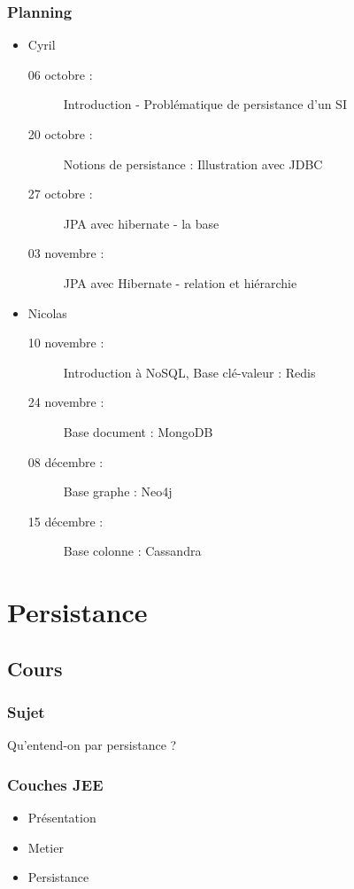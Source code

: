 \documentclass[t,12pt]{beamer}
\begin{document}
\begin{frame}
	\frametitle{Planning}

	\begin{itemize}
		\item Cyril
			\begin{description}
				\item [06 octobre : ] Introduction - Probl\'ematique de persistance d'un SI
				\item [20 octobre : ] Notions de persistance : Illustration avec JDBC
				\item [27 octobre : ] JPA avec hibernate - la base
				\item [03 novembre : ] JPA avec Hibernate - relation et hi\'erarchie
			\end{description}
		\item Nicolas
			\begin{description}
				\item [10 novembre : ] Introduction \`a NoSQL, Base cl\'e-valeur : Redis
				\item [24 novembre : ] Base document : MongoDB
				\item [08 d\'ecembre : ] Base graphe : Neo4j
				\item [15 d\'ecembre : ] Base colonne : Cassandra
			\end{description}
	\end{itemize}
\end{frame}



\section{Persistance}

\begin{frame}
	\tableofcontents[currentsection]
\end{frame}

\subsection{Cours}
\begin{frame}
	\frametitle{Sujet}

	Qu'entend-on par persistance ?
\end{frame}

\begin{frame}
	\frametitle{Couches JEE}

	\begin{itemize}
		\item Pr\'esentation
		\item Metier
		\item Persistance
	\end{itemize}
\end{frame}
\end{document}
